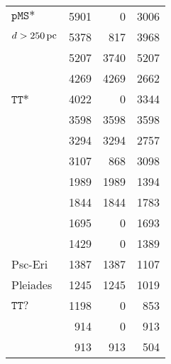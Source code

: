 \begin{tabular}{lrrr}
                 \citet{SIMBAD} $\texttt{pMS*}$ &               5901 &                 0 &                  3006 \\
\citet{GaiaCollaboration2018} $d>250\,{\rm pc}$ &               5378 &               817 &                  3968 \\
                           \citet{Kounkel2018}  &               5207 &              3740 &                  5207 \\
                        \citet{Ratzenbock2020}  &               4269 &              4269 &                  2662 \\
                  \citet{SIMBAD} $\texttt{TT*}$ &               4022 &                 0 &                  3344 \\
                        \citet{Damiani2019ums}  &               3598 &              3598 &                  3598 \\
                           \citet{Rizzuto2017}  &               3294 &              3294 &                  2757 \\
            \citet{NASAExoArchive_ps_20210506}  &               3107 &               868 &                  3098 \\
                              \citet{Tian2020}  &               1989 &              1989 &                  1394 \\
                           \citet{Goldman2018}  &               1844 &              1844 &                  1783 \\
                        \citet{CottenSong2016}  &               1695 &                 0 &                  1693 \\
                            \citet{Gagne2018a}  &               1429 &                 0 &                  1389 \\
             \citet{RoserSchilbach2020} Psc-Eri &               1387 &              1387 &                  1107 \\
            \citet{RoserSchilbach2020} Pleiades &               1245 &              1245 &                  1019 \\
                  \citet{SIMBAD} $\texttt{TT?}$ &               1198 &                 0 &                   853 \\
                            \citet{Gagne2018c}  &                914 &                 0 &                   913 \\
                          \citet{Pavlidou2021}  &                913 &               913 &                   504 \\

\end{tabular}
